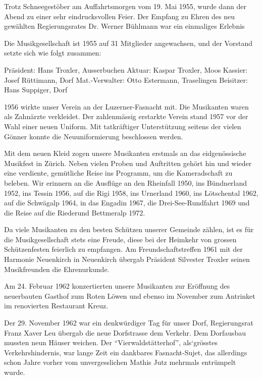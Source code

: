 \begin{history}
    Trotz Schneegestöber am Auffahrtsmorgen vom 19. Mai 1955, wurde dann der
    Abend zu einer sehr eindrucksvollen Feier. Der Empfang zu Ehren des neu
    gewählten Regierungsrates Dr. Werner Bühlmann war ein einmaliges Erlebnis

    Die Musikgesellschaft ist 1955 auf 31 Mitglieder angewachsen, und der
    Vorstand setzte sich wie folgt zusammen:

    Präsident: Hans Troxler, Ausserbuchen Aktuar: Kaspar Troxler, Moos Kassier:
    Josef Rüttimann, Dorf Mat.-Verwalter: Otto Estermann, Traselingen Beisitzer:
    Hans Suppiger, Dorf

    1956 wirkte unser Verein an der Luzerner-Fasnacht mit. Die Musikanten waren
    als Zahnärzte verkleidet. Der zahlenmässig erstarkte Verein stand 1957 vor
    der Wahl einer neuen Uniform. Mit tatkräftiger Unterstützung seitens der
    vielen Gönner konnte die Neuuniformierung beschlossen werden.

    Mit dem neuen Kleid zogen unsere Musikanten erstmals an das eidgenössische
    Musikfest in Zürich. Neben vielen Proben und Auftritten gehört hin und
    wieder eine verdiente, gemütliche Reise ins Programm, um die Kameradschaft
    zu beleben. Wir erinnern an die Ausflüge an den Rheinfall 1950, ins
    Bündnerland 1952, ins Tessin 1956, auf die Rigi 1958, ins Urnerland 1960,
    ins Lötschental 1962, auf die Schwägalp 1964, in das Engadin 1967, die
    Drei-See-Rundfahrt 1969 und die Reise auf die Riederund Bettmeralp 1972.

    Da viele Musikanten zu den besten Schützen unserer Gemeinde zählen, ist es
    für die Musikgesellschaft stets eine Freude, diese bei der Heimkehr von
    grossen Schützenfesten feierlich zu empfangen. Am Freundschaftstreffen 1961
    mit der Harmonie Neuenkirch in Neuenkirch übergab Präsident Silvester
    Troxler seinen Musikfreunden die Ehrenurkunde.

    Am 24. Februar 1962 konzertierten unsere Musikanten zur Eröffnung des
    neuerbauten Gasthof zum Roten Löwen und ebenso im November zum Antrinket im
    renovierten Restaurant Kreuz.

    Der 29. November 1962 war ein denkwürdiger Tag für unser Dorf, Regierungsrat
    Franz Xaver Leu übergab die neue Dorfstrasse dem Verkehr. Dem Dorfausbau
    mussten neun Häuser weichen. Der \enquote{Vierwaldstätterhof}, als`grösstes
    Verkehrshindernis, war lange Zeit ein dankbares Fasnacht-Sujet, das
    allerdings schon Jahre vorher vom unvergesslichen Mathis Jutz mehrmals
    entrümpelt wurde.


\end{history}
